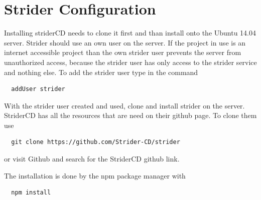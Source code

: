 \section{Strider Configuration}
\label{section:Strider Configuration}
Installing striderCD needs to clone it first and than install onto the Ubuntu 14.04 server. Strider should use an own user on the server.
If the project in use is an internet accessible project than the own strider user prevents the server from unauthorized access, because
the strider user has only access to the strider service and nothing else. To add the strider user type in the command
\begin{lstlisting}
  addUser strider
\end{lstlisting}
With the strider user created and used, clone and install strider on the server. StriderCD has all the resources that are need on their github page.
To clone them use
\begin{lstlisting}
  git clone https://github.com/Strider-CD/strider
\end{lstlisting}
or visit Github and search for the StriderCD github link.

The installation is done by the npm package manager with
\begin{lstlisting}
  npm install
\end{lstlisting}

